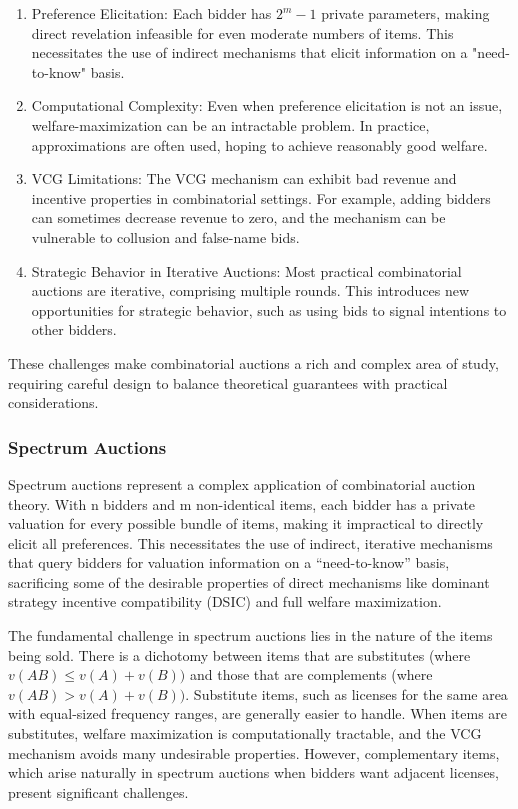 \documentclass[
  letterpaper,
  numbers=noenddot,
  DIV=11,
  oneside]{scrreprt}
\theoremstyle{remark}
\begin{document}
\begin{enumerate}
\def\labelenumi{\arabic{enumi}.}
\item
  Preference Elicitation: Each bidder has \(2^m - 1\) private
  parameters, making direct revelation infeasible for even moderate
  numbers of items. This necessitates the use of indirect mechanisms
  that elicit information on a "need-to-know" basis.
\item
  Computational Complexity: Even when preference elicitation is not an
  issue, welfare-maximization can be an intractable problem. In
  practice, approximations are often used, hoping to achieve reasonably
  good welfare.
\item
  VCG Limitations: The VCG mechanism can exhibit bad revenue and
  incentive properties in combinatorial settings. For example, adding
  bidders can sometimes decrease revenue to zero, and the mechanism can
  be vulnerable to collusion and false-name bids.
\item
  Strategic Behavior in Iterative Auctions: Most practical combinatorial
  auctions are iterative, comprising multiple rounds. This introduces
  new opportunities for strategic behavior, such as using bids to signal
  intentions to other bidders.
\end{enumerate}

These challenges make combinatorial auctions a rich and complex area of
study, requiring careful design to balance theoretical guarantees with
practical considerations.

\subsubsection*{Spectrum Auctions}\label{spectrum-auctions}

Spectrum auctions represent a complex application of combinatorial
auction theory. With n bidders and m non-identical items, each bidder
has a private valuation for every possible bundle of items, making it
impractical to directly elicit all preferences. This necessitates the
use of indirect, iterative mechanisms that query bidders for valuation
information on a ``need-to-know'' basis, sacrificing some of the
desirable properties of direct mechanisms like dominant strategy
incentive compatibility (DSIC) and full welfare maximization.

The fundamental challenge in spectrum auctions lies in the nature of the
items being sold. There is a dichotomy between items that are
substitutes (where \(v(AB) \leq v(A) + v(B))\) and those that are
complements (where \(v(AB) > v(A) + v(B))\). Substitute items, such as
licenses for the same area with equal-sized frequency ranges, are
generally easier to handle. When items are substitutes, welfare
maximization is computationally tractable, and the VCG mechanism avoids
many undesirable properties. However, complementary items, which arise
naturally in spectrum auctions when bidders want adjacent licenses,
present significant challenges.
\end{document}

